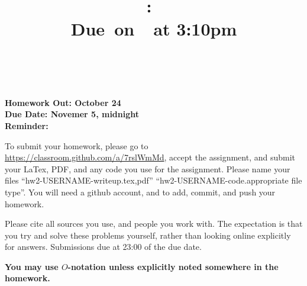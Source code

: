 \documentclass{article}
\title{    \vspace{2in}
    \textmd{\textbf{\hmwkClass:\ \hmwkTitle}}\\
    \normalsize\vspace{0.1in}\small{Due\ on\ \hmwkDueDate\ at 3:10pm}\\
    \vspace{0.1in}\large{\textit{\hmwkClassInstructor\ \hmwkClassTime}}
    \vspace{3in}
}
\author{\hmwkAuthorName}
\date{}
\theoremstyle{plain}
\newcommand{\hmwkAssignedDate}{October 24}
\newcommand{\hmwkDueDate}{Novemer 5, midnight}
\begin{document}

\pagebreak

{\bf Homework Out: \hmwkAssignedDate}\\
{\bf Due Date:  \hmwkDueDate}\\
{\bf Reminder: }

To submit your homework, please go to
\url{https://classroom.github.com/a/7rslWmMd}, accept the assignment,
and submit your LaTex, PDF, and any code you use for the
assignment. Please name your files ``hw2-USERNAME-writeup.{tex,pdf}''
``hw2-USERNAME-code.{appropriate file type}''. You will need a github
account, and to add, commit, and push your homework.

Please cite all sources you use, and people you work with. The
expectation is that you try and solve these problems yourself, rather
than looking online explicitly for answers. Submissions due at 23:00
of the due date.

{\bf You may use $O$-notation unless explicitly noted somewhere in the homework.}


\newcommand{\X}{\mathcal{X}}
\newcommand{\Y}{\mathcal{Y}}
\newcommand{\D}{\mathcal{D}}
\end{document}
